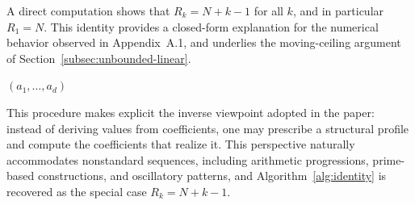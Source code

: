 \documentclass[11pt,a4paper]{amsart}
\theoremstyle{plain}
\theoremstyle{definition}
\theoremstyle{remark}
\begin{document}
\medskip
A direct computation shows that $R_k = N + k - 1$ for all $k$, and in particular $R_1 = N$. This identity provides a closed-form explanation for the numerical behavior observed in Appendix~A.1, and underlies the moving-ceiling argument of Section~\ref{subsec:unbounded-linear}.

\vspace{1em}
\begin{algorithm}[H]
\caption{Reconstruction of coefficients from a target sequence}
\label{alg:design_gen}
\BlankLine
{}
\Return $(a_1,\dots,a_d)$\;
\end{algorithm}

This procedure makes explicit the inverse viewpoint adopted in the paper: instead of deriving values from coefficients, one may prescribe a structural profile and compute the coefficients that realize it. This perspective naturally accommodates nonstandard sequences, including arithmetic progressions, prime-based constructions, and oscillatory patterns, and Algorithm~\ref{alg:identity} is recovered as the special case $R_k = N+k-1$.
\end{document}

